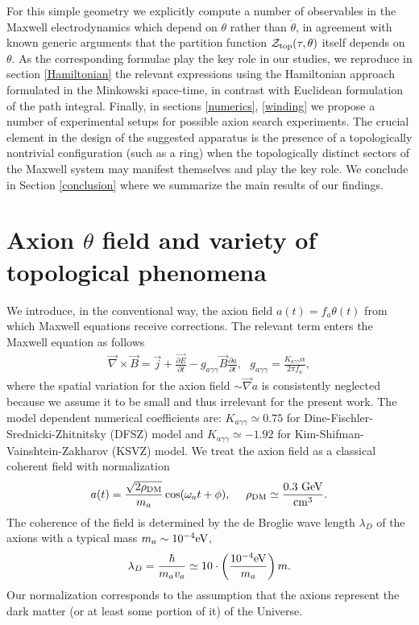 \documentclass[ twocolumn,aps,prd,   
               preprintnumbers,numbers,sort&compress,nofootinbib,
                            showpacs,superscriptaddress,
               colorlinks,
               linkcolor=blue,   
               citecolor=blue]{revtex4-1}   \newcommand{\exclude}[1]{}
\newcommand{\be}{\begin{eqnarray}}
\newcommand{\ee}{\end{eqnarray}}
\begin{document}
 For this simple geometry  we explicitly compute  a number of observables in the Maxwell electrodynamics which depend on  $\theta$ rather than   $\dot{\theta}$, in agreement with known generic arguments \cite{Witten:1995gf,Verlinde:1995mz,Olive:2000yy} that the partition function ${\cal{Z}}_{\rm top}(\tau, \theta )$  itself depends on $\theta$. As the corresponding formulae play the  key role in our studies, we reproduce in section \ref{Hamiltonian} the relevant expressions  using the Hamiltonian approach formulated in the Minkowski space-time, in contrast with Euclidean formulation of the path integral. 
   Finally, in sections \ref{numerics}, \ref{winding}  we  propose a number of 
  experimental setups for possible axion search experiments. The crucial element in the design of the suggested  apparatus  
  is the presence of a topologically nontrivial configuration (such as a ring)  when the topologically  distinct sectors of the Maxwell system may manifest themselves and play the key role.  We conclude in Section \ref{conclusion} where we summarize the main results of our findings. 
  

 \section{Axion $\theta$ field and variety of topological phenomena }\label{sect:axion}
We introduce, in the conventional way, the axion field $a(t) =f_a \theta (t)$ from which Maxwell equations receive corrections. 
The relevant term enters the Maxwell equation  as follows \cite{Sikivie:1983ip}
\be
\label{Maxwell}
\vec{\nabla}\times \vec{B}=\vec{j}+\frac{\vec{\partial E}}{\partial t}-g_{a\gamma\gamma}\vec{B}\frac{\partial a}{\partial t}, ~~~ g_{a\gamma\gamma}=\frac{K_{a\gamma\gamma} \alpha}{2\pi f_a}, 
\ee
where the spatial variation for the axion field  $\sim \vec{\nabla}a$ is consistently neglected because we assume it to be small and thus irrelevant for the present work. 
 The model dependent numerical coefficients are: $K_{a\gamma\gamma}\simeq 0.75$ for Dine-Fischler-Srednicki-Zhitnitsky (DFSZ) model and $K_{a\gamma\gamma}\simeq -1.92$ for Kim-Shifman-Vainshtein-Zakharov (KSVZ) model. 
 We treat the axion field as a classical coherent field \cite{Sikivie:2009fv} with normalization
 \be
 \label{axion}
 a(t)=\frac{\sqrt{2\rho_{\rm DM}}}{m_a}\cos (\omega_a t+\phi), ~~~~ \rho_{\rm DM}\simeq \frac{\rm 0.3~ GeV}{\rm cm^3}.
  \ee
 The coherence of the field is determined by the de Broglie wave length $ \lambda_D$ of the axions with a typical mass $m_a\sim 10^{-4} {\rm eV}$, 
 \be
 \label{lambda}
 \lambda_D=\frac{\hbar}{m_a v_a}\simeq 10\cdot \left(\frac{10^{-4} {\rm eV}}{m_a}\right) m .
 \ee
Our normalization corresponds to the assumption  that the axions  represent the dark matter  (or at least some portion of it) of the Universe. 
\end{document}
